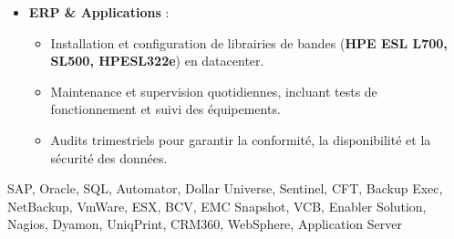 \begin{experiences}
{\begin{itemize}[left=0pt,label={},itemsep=0.5em]
          \item \textbf{ERP \& Applications} :
            \begin{itemize}[itemsep=0.2em,topsep=0.2em,parsep=0pt]
              \small
              \item Installation et configuration de librairies de bandes (\textbf{HPE ESL L700, SL500, HPESL322e}) en datacenter.  
              \item Maintenance et supervision quotidiennes, incluant tests de fonctionnement et suivi des équipements.  
              \item Audits trimestriels pour garantir la conformité, la disponibilité et la sécurité des données.
            \end{itemize}
        \end{itemize}
        \vspace{0.3em}
    }
    {SAP, Oracle, SQL, Automator, Dollar Universe, Sentinel, CFT, Backup Exec, NetBackup, VmWare, ESX, BCV, EMC Snapshot, VCB, Enabler Solution, Nagios, Dyamon, UniqPrint, CRM360, WebSphere, Application Server}

\emptySeparator
\end{experiences}